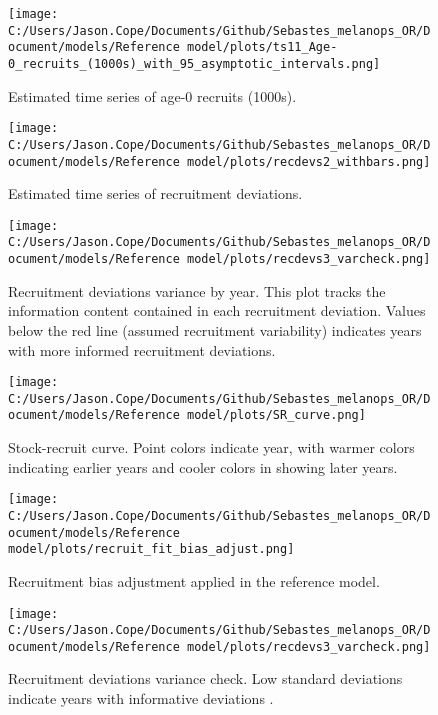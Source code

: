 \documentclass[11pt,
  english,
  letterpaper,
]{article}
\begin{document}
\begin{figure}
\centering
\texttt{[image: C:/Users/Jason.Cope/Documents/Github/Sebastes\_melanops\_OR/Document/models/Reference model/plots/ts11\_Age-0\_recruits\_(1000s)\_with\_95\_asymptotic\_intervals.png]}
\caption{Estimated time series of age-0 recruits (1000s).\label{fig:recruits}}
\end{figure}

\begin{figure}
\centering
\texttt{[image: C:/Users/Jason.Cope/Documents/Github/Sebastes\_melanops\_OR/Document/models/Reference model/plots/recdevs2\_withbars.png]}
\caption{Estimated time series of recruitment deviations.\label{fig:rec-devs}}
\end{figure}

\begin{figure}
\centering
\texttt{[image: C:/Users/Jason.Cope/Documents/Github/Sebastes\_melanops\_OR/Document/models/Reference model/plots/recdevs3\_varcheck.png]}
\caption{Recruitment deviations variance by year. This plot tracks the information content contained in each recruitment deviation. Values below the red line (assumed recruitment variability) indicates years with more informed recruitment deviations.\label{fig:rec-devs-sigmas}}
\end{figure}

\begin{figure}
\centering
\texttt{[image: C:/Users/Jason.Cope/Documents/Github/Sebastes\_melanops\_OR/Document/models/Reference model/plots/SR\_curve.png]}
\caption{Stock-recruit curve. Point colors indicate year, with warmer colors indicating earlier years and cooler colors in showing later years.\label{fig:bh-curve}}
\end{figure}

\begin{figure}
\centering
\texttt{[image: C:/Users/Jason.Cope/Documents/Github/Sebastes\_melanops\_OR/Document/models/Reference model/plots/recruit\_fit\_bias\_adjust.png]}
\caption{Recruitment bias adjustment applied in the reference model.\label{fig:bias-adj}}
\end{figure}

\begin{figure}
\centering
\texttt{[image: C:/Users/Jason.Cope/Documents/Github/Sebastes\_melanops\_OR/Document/models/Reference model/plots/recdevs3\_varcheck.png]}
\caption{Recruitment deviations variance check. Low standard deviations indicate years with informative deviations .\label{fig:varcheck}}
\end{figure}
\end{document}
